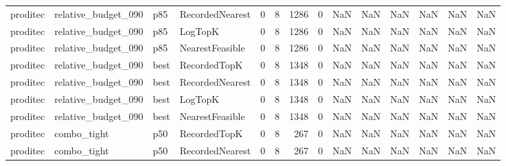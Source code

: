 \begin{tabular}{llllrrrrrrrrrr}
proditec &  relative\_budget\_090 &    p85 & RecordedNearest &           0 &          8 &           1286 &                   0 &            NaN &             NaN &                       NaN &            NaN &                    NaN &                     NaN \\
proditec &  relative\_budget\_090 &    p85 &         LogTopK &           0 &          8 &           1286 &                   0 &            NaN &             NaN &                       NaN &            NaN &                    NaN &                     NaN \\
proditec &  relative\_budget\_090 &    p85 & NearestFeasible &           0 &          8 &           1286 &                   0 &            NaN &             NaN &                       NaN &            NaN &                    NaN &                     NaN \\
proditec &  relative\_budget\_090 &   best &    RecordedTopK &           0 &          8 &           1348 &                   0 &            NaN &             NaN &                       NaN &            NaN &                    NaN &                     NaN \\
proditec &  relative\_budget\_090 &   best & RecordedNearest &           0 &          8 &           1348 &                   0 &            NaN &             NaN &                       NaN &            NaN &                    NaN &                     NaN \\
proditec &  relative\_budget\_090 &   best &         LogTopK &           0 &          8 &           1348 &                   0 &            NaN &             NaN &                       NaN &            NaN &                    NaN &                     NaN \\
proditec &  relative\_budget\_090 &   best & NearestFeasible &           0 &          8 &           1348 &                   0 &            NaN &             NaN &                       NaN &            NaN &                    NaN &                     NaN \\
proditec &          combo\_tight &    p50 &    RecordedTopK &           0 &          8 &            267 &                   0 &            NaN &             NaN &                       NaN &            NaN &                    NaN &                     NaN \\
proditec &          combo\_tight &    p50 & RecordedNearest &           0 &          8 &            267 &                   0 &            NaN &             NaN &                       NaN &            NaN &                    NaN &                     NaN \\

\end{tabular}
